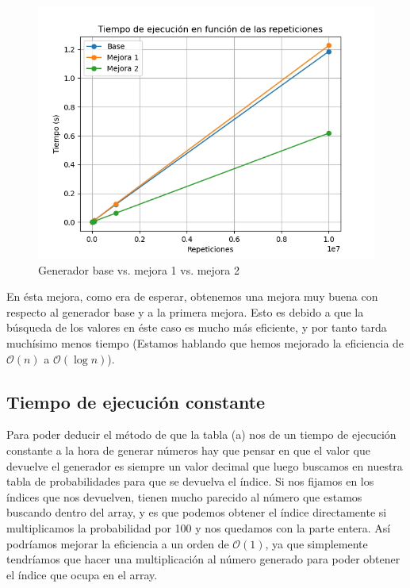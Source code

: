 \documentclass[11pt,a4paper]{report}
\begin{document}
\begin{figure}[H]
\centering
\includegraphics[width=\linewidth]{img/base-vs-m1-vs-m2.png}
\caption{Generador base vs. mejora 1 vs. mejora 2}
\label{mejora2}
\end{figure}

En ésta mejora, como era de esperar, obtenemos una mejora muy buena con respecto al generador base y a la primera mejora. Esto es debido a que la búsqueda de los valores en éste caso es mucho más eficiente, y por tanto tarda muchísimo menos tiempo (Estamos hablando que hemos mejorado la eficiencia de $\mathcal{O}(n)$ a $\mathcal{O}(\log n)$).

\newpage
\subsection{Tiempo de ejecución constante}

Para poder deducir el método de que la tabla (a) nos de un tiempo de ejecución constante a la hora de generar números hay que pensar en que el valor que devuelve el generador es siempre un valor decimal que luego buscamos en nuestra tabla de probabilidades para que se devuelva el índice. Si nos fijamos en los índices que nos devuelven, tienen mucho parecido al número que estamos buscando dentro del array, y es que podemos obtener el índice directamente si multiplicamos la probabilidad por 100 y nos quedamos con la parte entera. Así podríamos mejorar la eficiencia a un orden de $\mathcal{O}(1)$, ya que simplemente tendríamos que hacer una multiplicación al número generado para poder obtener el índice que ocupa en el array.
\end{document}
